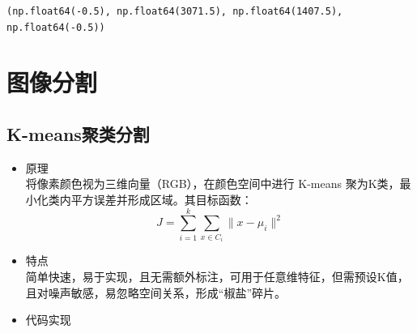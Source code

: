 \documentclass[11pt]{article}
\makeatletter
\newcommand{\boxspacing}{\kern\kvtcb@left@rule\kern\kvtcb@boxsep}
\newcommand{\prompt}[4]{
	{\ttfamily\llap{{\color{#2}[#3]:\hspace{3pt}#4}}\vspace{-\baselineskip}}
}
\makeatother
\begin{document}
            \begin{tcolorbox}[breakable, size=fbox, boxrule=.5pt, pad at break*=1mm, opacityfill=0]
\begin{Verbatim}[commandchars=\\\{\}]
(np.float64(-0.5), np.float64(3071.5), np.float64(1407.5), np.float64(-0.5))
\end{Verbatim}
\end{tcolorbox}
        
    \begin{center}
    \end{center}
    

\section{图像分割}
\subsection*{K-means聚类分割}
\begin{itemize}
	\item 原理\\
	将像素颜色视为三维向量（RGB），在颜色空间中进行 K-means 聚为K类，最小化类内平方误差并形成区域。其目标函数：
	$$J=\sum_{i=1}^{k}\sum_{x\in C_i}\|x-\mu_i\|^2$$
	\item 特点\\
	简单快速，易于实现，且无需额外标注，可用于任意维特征，但需预设K值，且对噪声敏感，易忽略空间关系，形成“椒盐”碎片。
	\item 代码实现
	\begin{center}
	\end{center}
\end{itemize}
\end{document}
